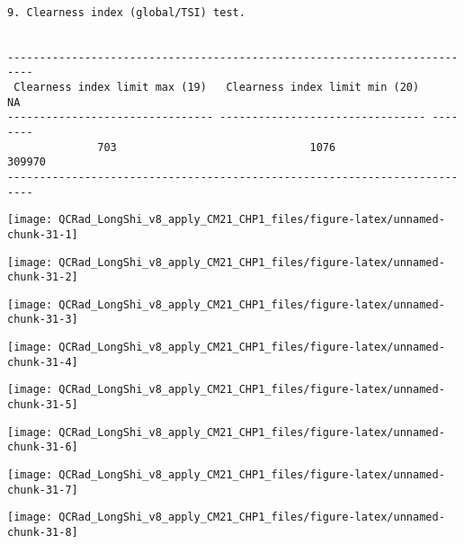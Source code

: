 \documentclass[
  10pt,
  a4paper,oneside]{article}
\begin{document}
\begin{verbatim}

9. Clearness index (global/TSI) test.


--------------------------------------------------------------------------
 Clearness index limit max (19)   Clearness index limit min (20)     NA   
-------------------------------- -------------------------------- --------
              703                              1076                309970 
--------------------------------------------------------------------------
\end{verbatim}

\begin{center}\texttt{[image: QCRad\_LongShi\_v8\_apply\_CM21\_CHP1\_files/figure-latex/unnamed-chunk-31-1]} \end{center}

\begin{center}\texttt{[image: QCRad\_LongShi\_v8\_apply\_CM21\_CHP1\_files/figure-latex/unnamed-chunk-31-2]} \end{center}

\begin{center}\texttt{[image: QCRad\_LongShi\_v8\_apply\_CM21\_CHP1\_files/figure-latex/unnamed-chunk-31-3]} \end{center}

\begin{center}\texttt{[image: QCRad\_LongShi\_v8\_apply\_CM21\_CHP1\_files/figure-latex/unnamed-chunk-31-4]} \end{center}

\begin{center}\texttt{[image: QCRad\_LongShi\_v8\_apply\_CM21\_CHP1\_files/figure-latex/unnamed-chunk-31-5]} \end{center}

\begin{center}\texttt{[image: QCRad\_LongShi\_v8\_apply\_CM21\_CHP1\_files/figure-latex/unnamed-chunk-31-6]} \end{center}

\begin{center}\texttt{[image: QCRad\_LongShi\_v8\_apply\_CM21\_CHP1\_files/figure-latex/unnamed-chunk-31-7]} \end{center}

\begin{center}\texttt{[image: QCRad\_LongShi\_v8\_apply\_CM21\_CHP1\_files/figure-latex/unnamed-chunk-31-8]} \end{center}
\end{document}
